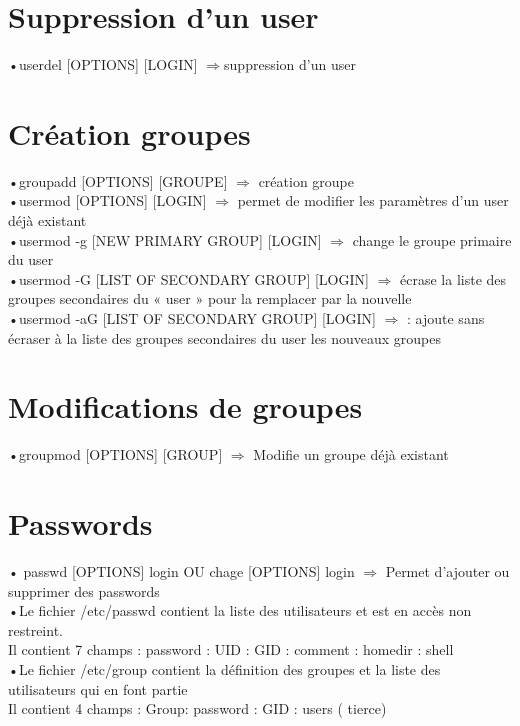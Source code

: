 \documentclass[a4paper, 11pt, french, oneside]{book}
\begin{document}
	\section{Suppression d'un user}
	
	•{\color{red}userdel [OPTIONS] [LOGIN]} $\Rightarrow$suppression d’un user
	
	\pagebreak 
	
	\section{Création groupes}
	•{\color{red}groupadd [OPTIONS] [GROUPE]} $\Rightarrow$ création groupe\\
	•{\color{red}usermod [OPTIONS] [LOGIN]} $\Rightarrow$ permet de modifier les paramètres d’un user déjà existant\\
	•{\color{red}usermod -g [NEW PRIMARY GROUP] [LOGIN]} $\Rightarrow$ change le groupe primaire du user\\
	•{\color{red}usermod -G [LIST OF SECONDARY GROUP] [LOGIN]} $\Rightarrow$ écrase la liste des groupes secondaires du « user » pour la remplacer par la nouvelle\\
	•{\color{red}usermod -aG [LIST OF SECONDARY GROUP] [LOGIN]} $\Rightarrow$ : ajoute sans écraser à la liste des groupes secondaires du user les nouveaux groupes
	
	\section{Modifications de groupes}
	•{\color{red}groupmod [OPTIONS] [GROUP]} $\Rightarrow$ Modifie un groupe déjà existant
	
	\section{Passwords}
	•\color{red}
	passwd [OPTIONS] login 
	{\color{black}OU}
	chage [OPTIONS] login
	\color{black}
	$\Rightarrow$ Permet d'ajouter ou supprimer des passwords\\
	
	•Le fichier {\color{blue}/etc/passwd} contient la liste des utilisateurs et est en accès non restreint.\\
Il contient 7 champs : password : UID : GID : comment : homedir : shell\\

	•Le fichier {\color{blue}/etc/group} contient la définition des groupes et la liste des utilisateurs qui en font partie\\
	Il contient 4 champs : Group: password : GID : users ( tierce)\\
	
\end{document}
